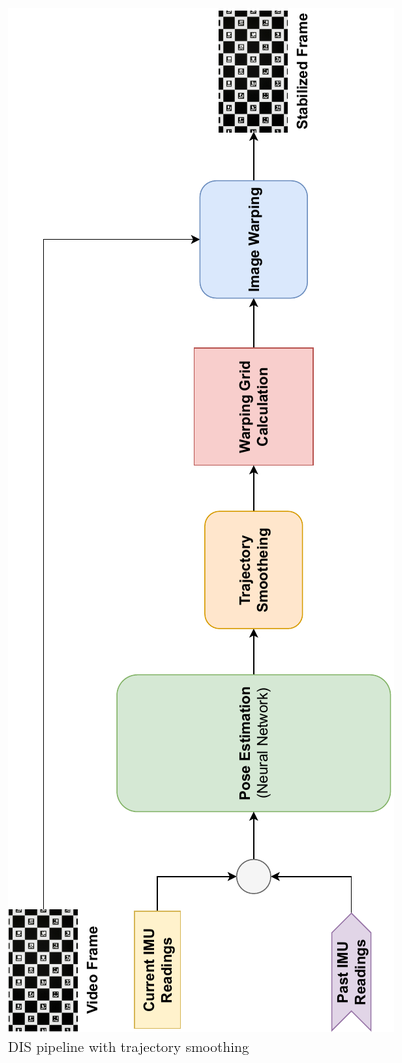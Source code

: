 \begin{figure}[H]
    \centering
    \includegraphics[scale=0.78]{images/fig_chapter4/dis_smooth_pipeline.pdf}
    \caption{DIS pipeline with trajectory smoothing}
    \label{fig:dis_smooth_pipeline}
\end{figure}




